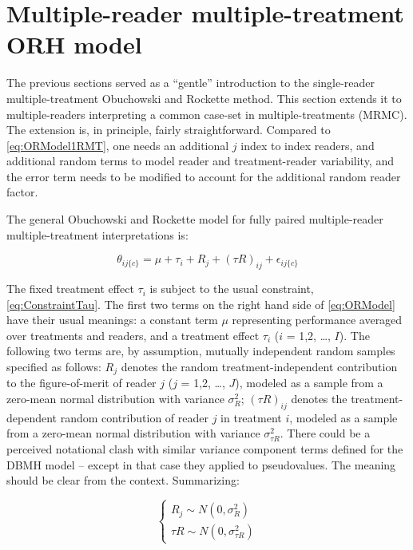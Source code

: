 \documentclass[
]{book}
\begin{document}
\hypertarget{multiple-reader-multiple-treatment-orh-model}{%
\section{Multiple-reader multiple-treatment ORH model}\label{multiple-reader-multiple-treatment-orh-model}}

The previous sections served as a ``gentle'' introduction to the single-reader multiple-treatment Obuchowski and Rockette method. This section extends it to multiple-readers interpreting a common case-set in multiple-treatments (MRMC). The extension is, in principle, fairly straightforward. Compared to \eqref{eq:ORModel1RMT}, one needs an additional \(j\) index to index readers, and additional random terms to model reader and treatment-reader variability, and the error term needs to be modified to account for the additional random reader factor.

The general Obuchowski and Rockette model for fully paired multiple-reader multiple-treatment interpretations is:

\begin{equation}
\theta_{ij\{c\}}=\mu+\tau_i+R_j+(\tau R)_{ij}+\epsilon_{ij\{c\}}
\label{eq:ORModel}
\end{equation}

The fixed treatment effect \(\tau_i\) is subject to the usual constraint, \eqref{eq:ConstraintTau}. The first two terms on the right hand side of \eqref{eq:ORModel} have their usual meanings: a constant term \(\mu\) representing performance averaged over treatments and readers, and a treatment effect \(\tau_i\) (\(i\) = 1,2, \ldots, \(I\)). The following two terms are, by assumption, mutually independent random samples specified as follows: \(R_j\) denotes the random treatment-independent contribution to the figure-of-merit of reader \(j\) (\(j\) = 1,2, \ldots, \(J\)), modeled as a sample from a zero-mean normal distribution with variance \(\sigma_R^2\); \((\tau R)_{ij}\) denotes the treatment-dependent random contribution of reader \(j\) in treatment \(i\), modeled as a sample from a zero-mean normal distribution with variance \(\sigma_{\tau R}^2\). There could be a perceived notational clash with similar variance component terms defined for the DBMH model -- except in that case they applied to pseudovalues. The meaning should be clear from the context. Summarizing:

\begin{equation}
\left\{\begin{matrix}
R_j \sim N(0,\sigma_R^2)\\ 
{\tau R} \sim N(0,\sigma_{\tau R}^2)
\end{matrix}\right.
\label{eq:ORVariances}
\end{equation}
\end{document}
